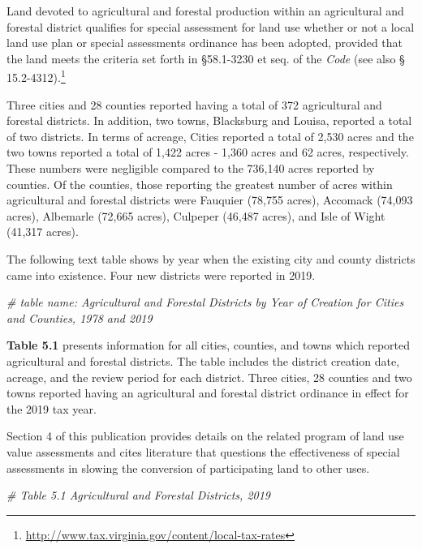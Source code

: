 \documentclass[
]{book}
\newenvironment{Shaded}{\begin{snugshade}}{\end{snugshade}}
\newcommand{\CommentTok}[1]{\textcolor[rgb]{0.56,0.35,0.01}{\textit{#1}}}
\begin{document}
Land devoted to agricultural and forestal production within an agricultural and forestal district qualifies for special assessment for land use whether or not a local land use plan or special assessments ordinance has been adopted, provided that the land meets the criteria set forth in §58.1-3230 et seq. of the \emph{Code} (see also § 15.2-4312).\footnote{\url{http://www.tax.virginia.gov/content/local-tax-rates}}

Three cities and 28 counties reported having a total of 372 agricultural and forestal districts. In addition, two towns, Blacksburg and Louisa, reported a total of two districts. In terms of acreage, Cities reported a total of 2,530 acres and the two towns reported a total of 1,422 acres - 1,360 acres and 62 acres, respectively. These numbers were negligible compared to the 736,140 acres reported by counties. Of the counties, those reporting the greatest number of acres within agricultural and forestal districts were Fauquier (78,755 acres), Accomack (74,093 acres), Albemarle (72,665 acres), Culpeper (46,487 acres), and Isle of Wight (41,317 acres).

The following text table shows by year when the existing city and county districts came into existence. Four new districts were reported in 2019.

\begin{Shaded}
\begin{Highlighting}[]
\CommentTok{\# table name: Agricultural and Forestal Districts by Year of Creation for Cities and Counties, 1978 and 2019}
\end{Highlighting}
\end{Shaded}

\textbf{Table 5.1} presents information for all cities, counties, and towns which reported agricultural and forestal districts. The table includes the district creation date, acreage, and the review period for each district. Three cities, 28 counties and two towns reported having an agricultural and forestal district ordinance in effect for the 2019 tax year.

Section 4 of this publication provides details on the related program of land use value assessments and cites literature that questions the effectiveness of special assessments in slowing the conversion of participating land to other uses.

\begin{Shaded}
\begin{Highlighting}[]
\CommentTok{\# Table 5.1 Agricultural and Forestal Districts, 2019}
\end{Highlighting}
\end{Shaded}
\end{document}
